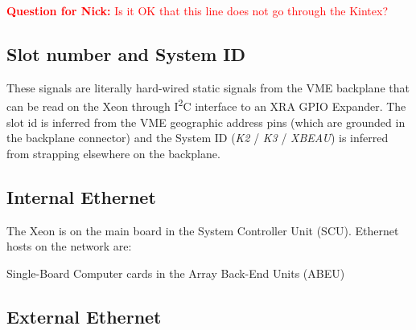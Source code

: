 \documentclass[12pt]{article}
\begin{document}
\textcolor{red}{\textbf{Question for Nick:} Is it OK that this line does not go through the Kintex?}



\subsection{Slot number and System ID}
\label{section:slot_system_id}

These signals are literally hard-wired static signals from the VME backplane that can be read on the Xeon through I\textsuperscript{2}C interface to an XRA GPIO Expander.
The slot id is inferred from the VME geographic address pins (which are grounded in the backplane connector) and the System ID (\textit{K2} / \textit{K3} / \textit{XBEAU}) is inferred from strapping elsewhere on the backplane.


\subsection{Internal Ethernet}
\label{section:internal_ethernet}

The Xeon is on the main board in the System Controller Unit (SCU).  Ethernet hosts on the network are:

Single-Board Computer cards in the Array Back-End Units (ABEU)




\subsection{External Ethernet}
\label{section:external_ethernet}
\end{document}
